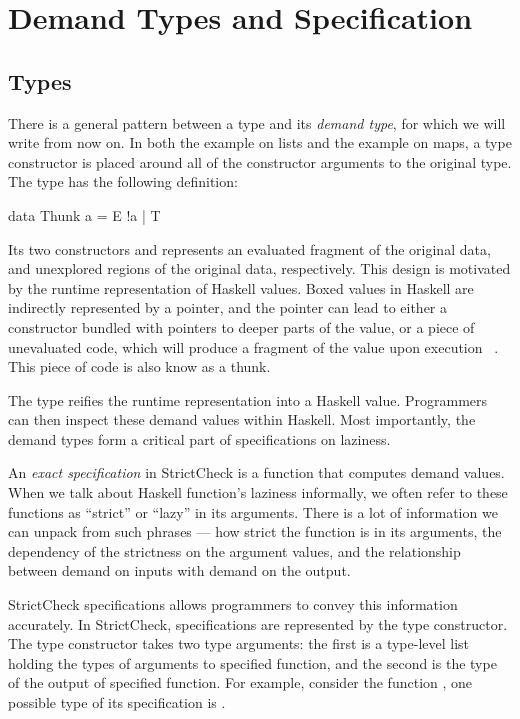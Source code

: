 \documentclass[acmsmall,review]{acmart}\settopmatter{}
\begin{document}
\section{Demand Types and Specification}
\label{sec:demand-types-and-spec}

\subsection{Types}
There is a general pattern between a type  and
its \textit{demand type}, for which we will write  from
now on. In both the example on lists and the example on maps,
a  type constructor is placed around all of the constructor
arguments to the original type. The  type has the following
definition:
\begin{inlinecode}
data Thunk a = E !a | T
\end{inlinecode}
Its two constructors  and  represents an evaluated
fragment of the original data, and unexplored regions of the original
data, respectively.
%
This design is motivated by the runtime representation of Haskell
values. Boxed values in Haskell are indirectly represented by a
pointer, and the pointer can lead to either a constructor bundled with
pointers to deeper parts of the value, or a piece of unevaluated code,
which will produce a fragment of the value upon execution
~\cite{SPJSTG}. This piece of code is also know as a thunk.

The  type reifies  the runtime
representation into a Haskell value. Programmers can then inspect
these demand values within Haskell. Most importantly, the demand types
form a critical part of specifications on laziness.

An \textit{exact specification} in StrictCheck is a function that
computes demand values. When we talk about Haskell function's laziness
informally, we often refer to these functions as ``strict'' or
``lazy'' in its arguments. There is a lot of information we can unpack
from such phrases --- how strict the function is in its arguments, the
dependency of the strictness on the argument values, and the
relationship between demand on inputs with demand on the output.

StrictCheck specifications allows programmers to convey this
information accurately. In StrictCheck, specifications are represented
by the  type constructor. The  type constructor
takes two type arguments: the first is a type-level list holding the
types of arguments to specified function, and the second is the type
of the output of specified function. For example, consider the
function , one possible type of its
specification is .
\end{document}
